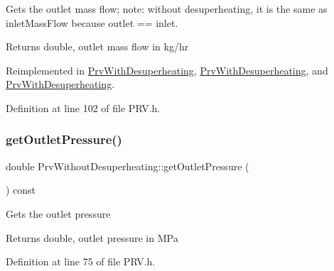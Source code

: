 Gets the outlet mass flow; note\+: without desuperheating, it is the same as inlet\+Mass\+Flow because outlet == inlet. \begin{DoxyReturn}{Returns}
double, outlet mass flow in kg/hr 
\end{DoxyReturn}


Reimplemented in \hyperlink{class_prv_with_desuperheating_a76c03ff2f54c85cd0c80543f23549635}{Prv\+With\+Desuperheating}, \hyperlink{class_prv_with_desuperheating_a76c03ff2f54c85cd0c80543f23549635}{Prv\+With\+Desuperheating}, and \hyperlink{class_prv_with_desuperheating_a76c03ff2f54c85cd0c80543f23549635}{Prv\+With\+Desuperheating}.



Definition at line 102 of file P\+R\+V.\+h.

\mbox{\label{class_prv_without_desuperheating_ae1d335703442deec2f2c2f93e4c862f2}} 
\subsubsection{\texorpdfstring{get\+Outlet\+Pressure()}{getOutletPressure()}\hspace{0.1cm}{\footnotesize\ttfamily [1/3]}}
{\footnotesize\ttfamily double Prv\+Without\+Desuperheating\+::get\+Outlet\+Pressure (\begin{DoxyParamCaption}{ }\end{DoxyParamCaption}) const\hspace{0.3cm}{\ttfamily [inline]}}

Gets the outlet pressure

\begin{DoxyReturn}{Returns}
double, outlet pressure in M\+Pa 
\end{DoxyReturn}


Definition at line 75 of file P\+R\+V.\+h.

\mbox{\label{class_prv_without_desuperheating_ae1d335703442deec2f2c2f93e4c862f2}} 

